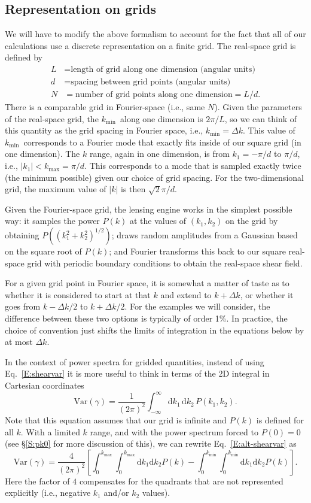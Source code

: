 \documentclass[preprint]{aastex}
\newcommand{\kmax}{\ensuremath{k_\mathrm{max}}}
\newcommand{\kmin}{\ensuremath{k_\mathrm{min}}}
\newcommand{\rmd}{\ensuremath{\mathrm{d}}}
\newcommand{\beq}{\begin{equation}}
\newcommand{\eeq}{\end{equation}}
\begin{document}
\subsection{Representation on grids}

We will have to modify the above formalism to account for the fact
that all of our calculations use a discrete representation on a finite
grid.  The real-space  
grid is defined by
\begin{align}
L &= \mbox{length of grid along one dimension (angular units)}\\
d &= \mbox{spacing between grid points (angular units)}\\
N &= \mbox{number of grid points along one dimension} = L/d.
\end{align}
There is a comparable grid in Fourier-space (i.e., same $N$).  Given
the parameters of the real-space grid, the \kmin\ along one dimension
is $2\pi/L$, so we can think of this quantity as the grid spacing in
Fourier space, i.e., $\kmin=\Delta k$.  This value of \kmin\
corresponds to a Fourier mode that exactly fits inside of our square
grid (in one dimension).  The $k$ range, again in one dimension, is
from $k_1=-\pi/d$ to $\pi/d$, i.e., $|k_1|<\kmax=\pi/d$.  This
corresponds to a mode that is sampled exactly twice (the minimum
possible) given our choice of grid spacing.  For the two-dimensional
grid, the maximum value of $|k|$ is then $\sqrt{2}\pi/d$.

Given the Fourier-space grid, the lensing engine works in the simplest
possible way: it samples the power $P(k)$ at the values of $(k_1,
k_2)$ on the grid by obtaining $P((k_1^2+k_2^2)^{1/2})$; draws
random amplitudes from a Gaussian based on the square root of $P(k)$;
and Fourier transforms this back to our square real-space grid with
periodic boundary conditions to obtain the real-space shear field.

For a given grid point in
Fourier space, it is
somewhat a matter of taste as to whether it is considered to start at
that $k$ and extend to $k+\Delta k$, or whether it goes from $k-\Delta
k/2$ to $k+\Delta k/2$.  For the examples we will consider, the
difference between these two options is typically of order 1\%.  In
practice, the choice of convention just shifts the limits of
integration in the equations below by at most $\Delta k$.

In the context 
of power spectra for gridded quantities, instead of using
Eq.~\ref{E:shearvar} it is more useful to think in
terms of the 2D integral in Cartesian coordinates
\beq\label{E:alt-shearvar}
\mathrm{Var}(\gamma) = \frac{1}{(2\pi)^2} \int_{-\infty}^{\infty} \rmd k_1 \,\rmd k_2 \,
P(k_1, k_2).
\eeq
Note that this equation assumes that our grid is infinite and $P(k)$
is defined for all $k$.  With a limited $k$
range, and with the power spectrum forced to $P(0)=0$ (see \S\ref{S:pk0}
for more discussion of this), we can rewrite Eq.~\ref{E:alt-shearvar} as
\beq\label{E:alt-shearvar-limit}
\mathrm{Var}(\gamma) = \frac{4}{(2\pi)^2} \left[\int_{0}^{\kmax}\int_{0}^{\kmax} \rmd
k_1 \rmd k_2 P(k) - \int_{0}^{\kmin}\int_{0}^{\kmin} \rmd k_1 \rmd k_2
P(k)\right].
\eeq
Here the factor of $4$ compensates for the 
quadrants that are not represented explicitly (i.e., negative $k_1$
and/or $k_2$ values).
\end{document}
